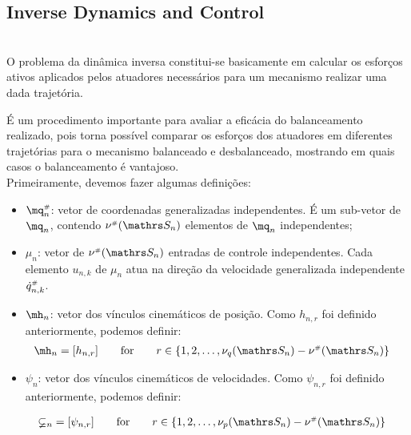 \subsection{Inverse Dynamics and Control}\label{S02-3}

\\

O problema da din\^amica inversa constitui-se basicamente em calcular os esfor\c{c}os ativos aplicados pelos atuadores necess\'arios para um mecanismo realizar uma dada trajet\'oria.

\'E um procedimento importante para avaliar a efic\'acia do balanceamento realizado, pois torna poss\'ivel comparar os esfor\c{c}os dos atuadores em diferentes trajet\'orias para o mecanismo balanceado e desbalanceado, mostrando em quais casos o balanceamento \'e vantajoso. \\

Primeiramente, devemos fazer algumas defini\c{c}\~oes:

\begin{itemize}
\item $\mq_n\ssh$: vetor de coordenadas generalizadas independentes. \'E um sub-vetor de $\mq_n$, contendo $\nu\ssh(\ssS_n)$ elementos de $\mq_n$ independentes;
\item $\mu_n$: vetor de $\nu\ssh(\ssS_n)$ entradas de controle independentes. Cada elemento $u_{n,k}$ de $\mu_n$ atua na dire\c{c}\~ao da velocidade generalizada independente $\dot{q}_{n,k}^{\scriptscriptstyle \#}$.
\item $\mh_n$: vetor dos v\'inculos cinem\'aticos de posi\c{c}\~ao. Como $h_{n, r}$ foi definido anteriormente, podemos definir:
\begin{align}
&	\mh_n = \nvct{h_{n,r}}
	\qquad \text{for} \qquad
	r \in \{1, 2, \ldots, \nu_q(\ssS_n) - \nu\ssh(\ssS_n)\}
	\label{eq:Teste2} %
\end{align}
\item $\mathbb{\psi}_n$: vetor dos v\'inculos cinem\'aticos de velocidades. Como $\psi_{n, r}$ foi definido anteriormente, podemos definir:

\begin{align}
&	\mathbb{\psi}_n = \nvct{\psi_{n,r}}
	\qquad \text{for} \qquad
	r \in \{1, 2, \ldots, \nu_p(\ssS_n) - \nu\ssh(\ssS_n)\}
	\label{eq:Teste3} %
\end{align}

\end{itemize}

